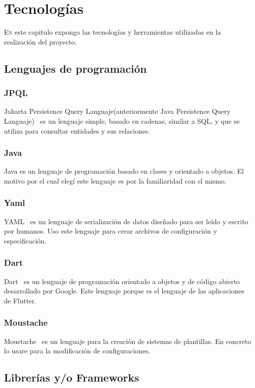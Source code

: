 \chapter{Tecnologías}
\label{chap:tecnologias}

\lettrine{E}{n} este capitulo expongo las tecnologías y herramientas utilizadas en la realización del proyecto.



\section{Lenguajes de programación}
    \subsection{JPQL}
    Jakarta Persistence Query Languaje(anteriormente Java Persistence Query Languaje)~\cite{JPQL} es un lenguaje simple, basado en cadenas, similar a SQL, y que se utiliza para consultar entidades y sus relaciones.
    \subsection{Java}
    Java es un lenguaje de programación basado en clases y orientado a objetos. El motivo por el cual elegí este lenguaje es por la familiaridad con el mismo.
    \subsection{Yaml}
    YAML~\cite{YAML} es un lenguaje de serialización de datos diseñado para ser leído y escrito por humanos. Uso este lenguaje para crear archivos de configuración y especificación.
    \subsection{Dart}
    Dart~\cite{Dart} es un lenguaje de programación orientado a objetos y de código abierto desarrollado por Google. Este lenguaje porque es el lenguaje de las aplicaciones de Flutter.
    \subsection{Moustache}
    Moustache~\cite{Moustache} es un lenguaje para la creación de sistemas de plantillas. En concreto lo usare para la modificación de configuraciones. 

\section{Librerías y/o Frameworks}
